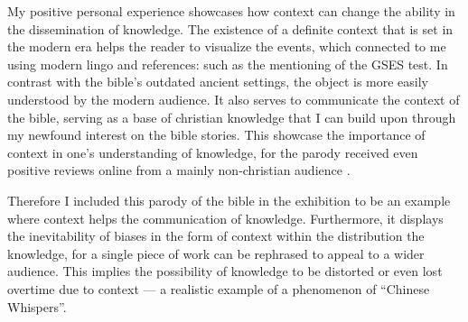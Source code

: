\documentclass[a4paper,11pt]{article}
\begin{document}
My positive personal experience showcases how context can change the ability in the dissemination of knowledge. The existence of a definite context that is set in the modern era helps the reader to visualize the events, which connected to me using modern lingo and references: such as the mentioning of the GSES test. In contrast with the bible's outdated ancient settings, the object is more easily understood by the modern audience. It also serves to communicate the context of the bible, serving as a base of christian knowledge that I can build upon through my newfound interest on the bible stories. This showcase the importance of context in one's understanding of knowledge, for the parody received even positive reviews online from a mainly non-christian audience \parencite{Review}.




Therefore I included this parody of the bible in the exhibition to be an example where context helps the communication of knowledge. Furthermore, it displays the inevitability of biases in the form of context within the distribution the knowledge, for a single piece of work can be rephrased to appeal to a wider audience. This implies the possibility of knowledge to be distorted or even lost overtime due to context --- a realistic example of a phenomenon of ``Chinese Whispers''.

\end{document}
